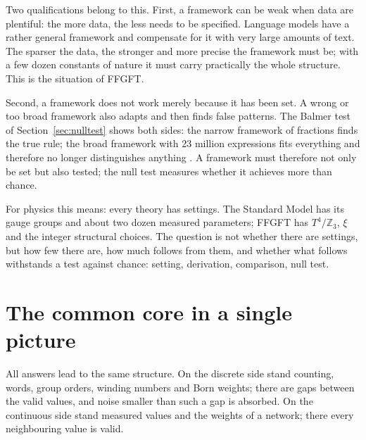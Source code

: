 Two qualifications belong to this. First, a framework can be weak when data are plentiful: the more
data, the less needs to be specified. Language models have a rather general framework and compensate
for it with very large amounts of text. The sparser the data, the stronger and more precise the
framework must be; with a few dozen constants of nature it must carry practically the whole structure.
This is the situation of FFGFT.

Second, a framework does not work merely because it has been set. A wrong or too broad framework also
adapts and then finds false patterns. The Balmer test of Section~\ref{sec:nulltest} shows both sides:
the narrow framework of fractions finds the true rule; the broad framework with 23 million expressions
fits everything and therefore no longer distinguishes anything \KM. A framework must therefore not
only be set but also tested; the null test measures whether it achieves more than chance.

For physics this means: every theory has settings. The Standard Model has its gauge groups and about
two dozen measured parameters; FFGFT has $T^4/\mathbb Z_3$, $\xi$ and the integer structural choices.
The question is not whether there are settings, but how few there are, how much follows from them,
and whether what follows withstands a test against chance: setting, derivation, comparison, null
test.

\section{The common core in a single picture}

All answers lead to the same structure. On the discrete side stand counting, words, group orders,
winding numbers and Born weights; there are gaps between the valid values, and noise smaller than such
a gap is absorbed. On the continuous side stand measured values and the weights of a network; there
every neighbouring value is valid.

